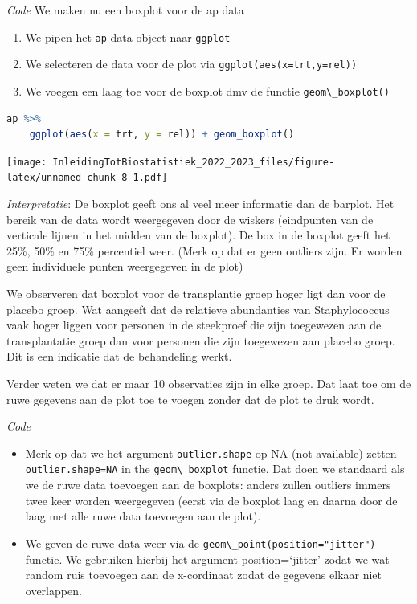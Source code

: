 \documentclass[
  12pt,dutch,coursenotes]{book}
\newcommand{\passthrough}[1]{#1}
\providecommand{\tightlist}{%
  \setlength{\itemsep}{0pt}\setlength{\parskip}{0pt}}
\begin{document}
\emph{Code}
We maken nu een boxplot voor de ap data

\begin{enumerate}
\def\labelenumi{\arabic{enumi}.}
\tightlist
\item
  We pipen het \passthrough{\lstinline!ap!} data object naar \passthrough{\lstinline!ggplot!}
\item
  We selecteren de data voor de plot via \passthrough{\lstinline!ggplot(aes(x=trt,y=rel))!}
\item
  We voegen een laag toe voor de boxplot dmv de functie \passthrough{\lstinline!geom\_boxplot()!}
\end{enumerate}

\begin{lstlisting}[language=R]
ap %>%
    ggplot(aes(x = trt, y = rel)) + geom_boxplot()
\end{lstlisting}

\texttt{[image: InleidingTotBiostatistiek\_2022\_2023\_files/figure-latex/unnamed-chunk-8-1.pdf]}

\emph{Interpretatie}: De boxplot geeft ons al veel meer informatie dan de barplot. Het bereik van de data wordt weergegeven door de wiskers (eindpunten van de verticale lijnen in het midden van de boxplot). De box in de boxplot geeft het 25\%, 50\% en 75\% percentiel weer. (Merk op dat er geen outliers zijn. Er worden geen individuele punten weergegeven in de plot)

We observeren dat boxplot voor de transplantie groep hoger ligt dan voor de placebo groep. Wat aangeeft dat de relatieve abundanties van Staphylococcus vaak hoger liggen voor personen in de steekproef die zijn toegewezen aan de transplantatie groep dan voor personen die zijn toegewezen aan placebo groep. Dit is een indicatie dat de behandeling werkt.

Verder weten we dat er maar 10 observaties zijn in elke groep. Dat laat toe om de ruwe gegevens aan de plot toe te voegen zonder dat de plot te druk wordt.

\emph{Code}

\begin{itemize}
\tightlist
\item
  Merk op dat we het argument \passthrough{\lstinline!outlier.shape!} op NA (not available) zetten \passthrough{\lstinline!outlier.shape=NA!} in the \passthrough{\lstinline!geom\_boxplot!} functie. Dat doen we standaard als we de ruwe data toevoegen aan de boxplots: anders zullen outliers immers twee keer worden weergegeven (eerst via de boxplot laag en daarna door de laag met alle ruwe data toevoegen aan de plot).
\item
  We geven de ruwe data weer via de \passthrough{\lstinline!geom\_point(position="jitter")!} functie. We gebruiken hierbij het argument position=`jitter' zodat we wat random ruis toevoegen aan de x-cordinaat zodat de gegevens elkaar niet overlappen.
\end{itemize}
\end{document}
